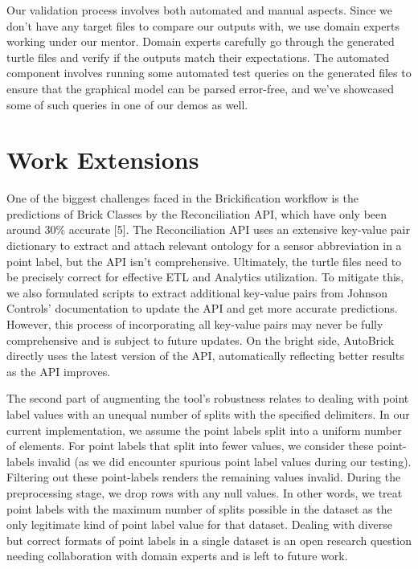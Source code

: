 \documentclass[twocolumn, switch]{article} %
\begin{document}
Our validation process involves both automated and manual aspects. Since we don't have any target files to compare our outputs with, we use domain experts working under our mentor. Domain experts carefully go through the generated turtle files and verify if the outputs match their expectations. The automated component involves running some automated test queries on the generated files to ensure that the graphical model can be parsed error-free, and we’ve showcased some of such queries in one of our demos as well.

\section{Work Extensions}
One of the biggest challenges faced in the Brickification workflow is the
predictions of Brick Classes by the Reconciliation API, which have only been
around 30\% accurate [5]. The Reconciliation API uses an extensive key-value pair dictionary to extract and attach relevant ontology for a sensor abbreviation in a point label, but the API isn’t comprehensive. Ultimately, the turtle files need to be precisely correct for effective ETL and Analytics utilization. To mitigate this, we also formulated scripts to extract additional key-value pairs from Johnson Controls’ documentation to update the API and get more accurate predictions. However, this process of incorporating all key-value pairs may never be fully comprehensive and is subject to future updates. On the bright side, AutoBrick directly uses the latest version of the API, automatically reflecting better results as the API improves. 

	The second part of augmenting the tool’s robustness relates to dealing with point label values with an unequal number of splits with the specified delimiters. In our current implementation, we assume the point labels split into a uniform number of elements. For point labels that split into fewer values, we consider these point-labels invalid (as we did encounter spurious point label values during our testing). Filtering out these point-labels renders the remaining values invalid. During the preprocessing stage, we drop rows with any null values. In other words, we treat point labels with the maximum number of splits possible in the dataset as the only legitimate kind of point label value for that dataset. Dealing with diverse but correct formats of point labels in a single dataset is an open research question needing collaboration with domain experts and is left to future work.
\end{document}
